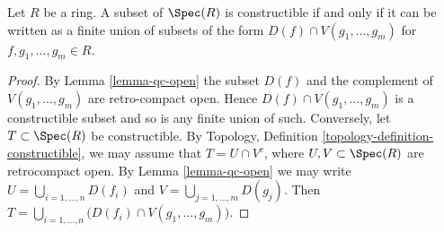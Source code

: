 \begin{lemma}
\label{lemma-constructible}
Let $R$ be a ring. A subset of $\Spec(R)$ is constructible if and only
if it can be written as a finite union of subsets of the form
$D(f) \cap V(g_1, \ldots, g_m)$ for $f, g_1, \ldots, g_m \in R$.
\end{lemma}

\begin{proof}
By Lemma \ref{lemma-qc-open} the subset $D(f)$ and the complement of
$V(g_1, \ldots, g_m)$ are retro-compact open. Hence
$D(f) \cap V(g_1, \ldots, g_m)$ is a constructible subset and so is
any finite union of such. Conversely, let $T \subset \Spec(R)$ be
constructible. By Topology, Definition \ref{topology-definition-constructible},
we may assume that $T = U \cap V^c$, where $U, V \subset \Spec(R)$
are retrocompact open. By Lemma \ref{lemma-qc-open} we may write
$U = \bigcup_{i = 1, \ldots, n} D(f_i)$ and
$V = \bigcup_{j = 1, \ldots, m} D(g_j)$. Then
$T = \bigcup_{i = 1, \ldots, n} \big(D(f_i) \cap V(g_1, \ldots, g_m)\big)$.
\end{proof}